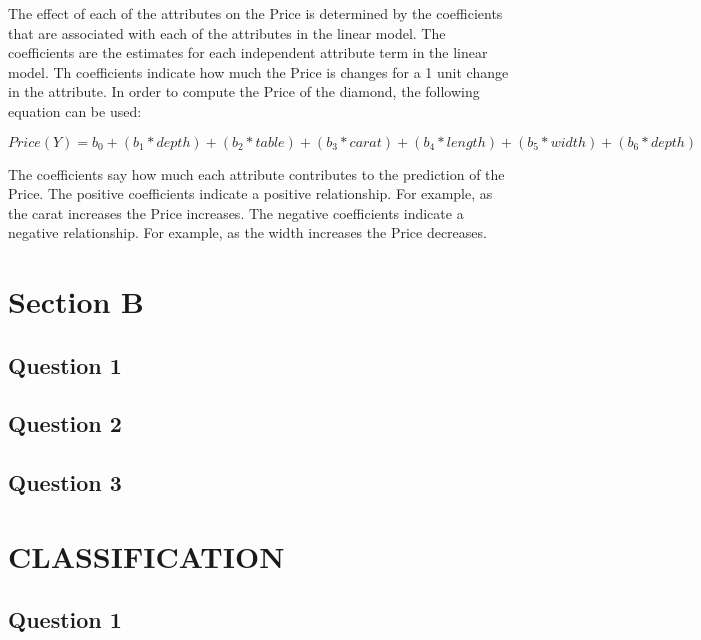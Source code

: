 \documentclass[
]{article}
\begin{document}
The effect of each of the attributes on the Price is determined by the
coefficients that are associated with each of the attributes in the
linear model. The coefficients are the estimates for each independent
attribute term in the linear model. Th coefficients indicate how much
the Price is changes for a 1 unit change in the attribute. In order to
compute the Price of the diamond, the following equation can be used:

\[Price (Y) = b_{0} + ( b_{1} * depth)  + (b_{2} * table ) + (b_{3} * carat )  + (b_{4} * length ) + (b_{5} * width ) + (b_{6} * depth )\]

The coefficients say how much each attribute contributes to the
prediction of the Price. The positive coefficients indicate a positive
relationship. For example, as the carat increases the Price increases.
The negative coefficients indicate a negative relationship. For example,
as the width increases the Price decreases.

\hypertarget{section-b}{%
\section{Section B}\label{section-b}}

\hypertarget{question-1-1}{%
\subsection{Question 1}\label{question-1-1}}

\hypertarget{question-2-1}{%
\subsection{Question 2}\label{question-2-1}}

\hypertarget{question-3}{%
\subsection{Question 3}\label{question-3}}

\hypertarget{classification}{%
\section{CLASSIFICATION}\label{classification}}

\hypertarget{question-1-2}{%
\subsection{Question 1}\label{question-1-2}}
\end{document}
